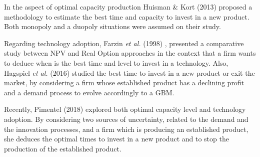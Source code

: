 In the aspect of optimal capacity production Huisman \& Kort (2013) \cite{huis:cap} proposed a methodology to estimate the best time and capacity to invest in a new product. Both monopoly and a duopoly situations were assumed on their study.

Regarding technology adoption,
Farzin \textit{et al.} (1998) \cite{farzin:cap}, presented a comparative study between NPV and Real Option approaches in the context that a firm wants to deduce when is the best time and level to invest in a technology.
Also, Hagspiel \textit{et al.} (2016) \cite{hagspiel:cap} studied the best time to invest in a new product or exit the market, by considering a firm whose established product has a declining profit and a demand process to evolve accordingly to a GBM. %


Recently, Pimentel (2018) \cite{rita} explored both optimal capacity level and technology adoption. By considering two sources of uncertainty, related to the demand and the innovation processes,
and a firm which is producing an established product, she deduces the optimal times to invest in a new product and to stop the production of the established product. 







